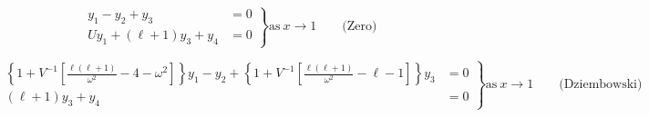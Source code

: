 \documentclass[fleqn]{article}
\newcommand{\diff}{\ensuremath{\mathrm{d}}}
\newcommand{\ii}{\ensuremath{\mathrm{i}}}
\newcommand{\Vg}{\ensuremath{\frac{V}{\Gamma_{1}}}}
\newcommand{\As}{\ensuremath{A^{\ast}}}
\newcommand{\nabad}{\ensuremath{\nabla_{\rm ad}}}
\newcommand{\kapS}{\ensuremath{\kappa_{S}}}
\newcommand{\crad}{\ensuremath{c_{\rm rad}}}
\newcommand{\cepsad}{\ensuremath{c_{\epsilon,{\rm ad}}}}
\newcommand{\cepsS}{\ensuremath{c_{\epsilon,S}}}
\newcommand{\cthm}{\ensuremath{c_{\rm thm}}}
\newcommand{\ckap}{\ensuremath{c_{\rm kap}}}
\newcommand{\Rstar}{\ensuremath{R_{\ast}}}
\newcommand{\Lrad}{\ensuremath{L_{\rm rad}}}
\newcommand{\Lstar}{\ensuremath{L_{\ast}}}
\begin{document}
\begin{equation*}
\left.
\begin{aligned}
y_{1} - y_{2} + y_{3} &= 0 \\
U y_{1} + (\ell + 1) y_{3} + y_{4} &= 0
\end{aligned}
\right\}
\text{as}\ x \rightarrow 1 \qquad \text{(Zero)}
\end{equation*}

\begin{equation*}
\left.
\begin{aligned}
\left\{ 1 + V^{-1} \left[ \frac{\ell(\ell+1)}{\omega^{2}} - 4 - \omega^{2} \right] \right\} y_{1} -
y_{2} +
\left\{ 1 + V^{-1} \left[ \frac{\ell(\ell+1)}{\omega^{2}} - \ell - 1 \right] \right\} y_{3} &= 0 \\
(\ell + 1) y_{3} + y_{4} &= 0
\end{aligned}
\right\} 
\text{as}\ x \rightarrow 1 \qquad \text{(Dziembowski)}
\end{equation*}







\end{document}
